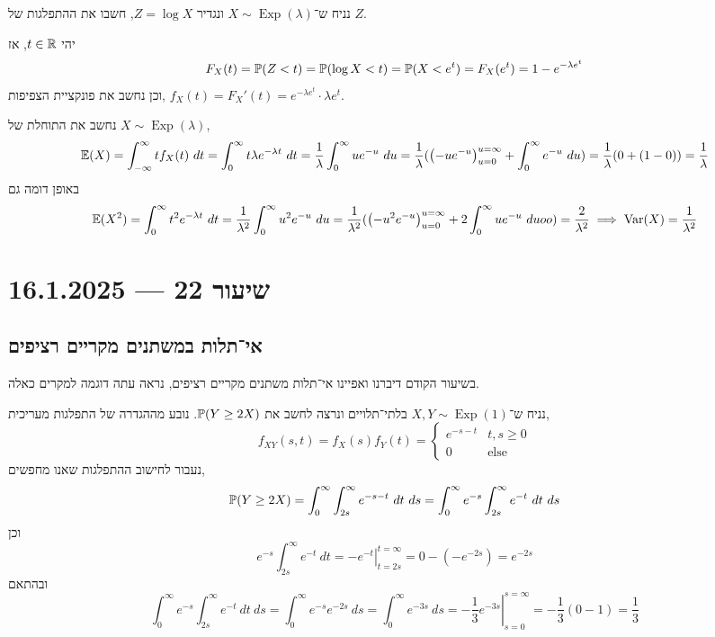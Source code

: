 \begin{exercise}
	נניח ש־$X \sim \operatorname{Exp}(\lambda)$ ונגדיר $Z = \log X$, חשבו את ההתפלגות של $Z$.
\end{exercise}
\begin{solution}
	יהי $t \in \mathbb{R}$, אז
	\[
		F_X(t)
		= \mathbb{P}(Z < t)
		= \mathbb{P}(\log X < t)
		= \mathbb{P}(X < e^t)
		= F_X(e^t)
		= 1 - e^{-\lambda e^t}
	\]
	וכן נחשב את פונקציית הצפיפות, $ f_X(t) = F_X'(t) = e^{-\lambda e^t} \cdot \lambda e^t$.
\end{solution}
\begin{example}
	נחשב את התוחלת של $X \sim \operatorname{Exp}(\lambda)$,
	\[
		\mathbb{E}(X)
		= \int_{-\infty}^{\infty} t f_X(t)\ dt
		= \int_{0}^{\infty} t \lambda e^{-\lambda t}\ dt
		= \frac{1}{\lambda} \int_{0}^{\infty} u e^{-u}\ du
		= \frac{1}{\lambda} ({\left( - u e^{-u} \right)}_{u = 0}^{u = \infty} + \int_{0}^{\infty} e^{-u}\ du)
		= \frac{1}{\lambda} (0 + (1 - 0))
		= \frac{1}{\lambda}
	\]
	באופן דומה גם
	\[
		\mathbb{E}(X^2)
		= \int_{0}^{\infty} t^2 e^{-\lambda t}\ dt
		= \frac{1}{\lambda^2} \int_{0}^{\infty} u^2 e^{-u}\ du
		= \frac{1}{\lambda^2} ({\left(-u^2 e^{-u}\right)}_{u = 0}^{u = \infty} + 2 \int_{0}^{\infty} u e^{-u}\ duoo)
		= \frac{2}{\lambda^2}
		\implies
		\operatorname{Var}(X)
		= \frac{1}{\lambda^2}
	\]
\end{example}

\section{שיעור 22 --- 16.1.2025}
\subsection{אי־תלות  במשתנים מקריים רציפים}
בשיעור הקודם דיברנו ואפיינו אי־תלות משתנים מקריים רציפים, נראה עתה דוגמה למקרים כאלה.
\begin{example}
	נניח ש־$X, Y \sim \operatorname{Exp}(1)$ בלתי־תלויים ונרצה לחשב את $\mathbb{P}(Y \ge 2X)$.
	נובע מההגדרה של התפלגות מעריכית,
	\[
		f_{X Y}(s, t)
		= f_X(s) f_Y(t)
		= \begin{cases}
			e^{-s - t} & t, s \ge 0 \\
			0 & \text{else}
		\end{cases}
	\]
	נעבור לחישוב ההתפלגות שאנו מחפשים,
	\[
		\PP(Y \ge 2X)
		= \int_{0}^{\infty} \int_{2s}^{\infty} e^{-s - t}\ dt\ ds
		= \int_{0}^{\infty} e^{-s} \int_{2s}^{\infty} e^{-t}\ dt\ ds
	\]
	וכן
	\[
		e^{-s} \int_{2s}^{\infty} e^{-t}\ dt
		= \left. -e^{-t} \right\rvert_{t = 2s}^{t = \infty}
		= 0 - (-e^{-2s})
		= e^{-2s}
	\]
	ובהתאם
	\[
		\int_{0}^{\infty} e^{-s} \int_{2s}^{\infty} e^{-t}\ dt\ ds
		= \int_{0}^{\infty} e^{-s} e^{-2s}\ ds
		= \int_{0}^{\infty} e^{-3s}\ ds
		= \left. -\frac{1}{3} e^{-3s} \right\rvert_{s = 0}^{s = \infty}
		= -\frac{1}{3}(0 - 1)
		= \frac{1}{3}
	\]
\end{example}

